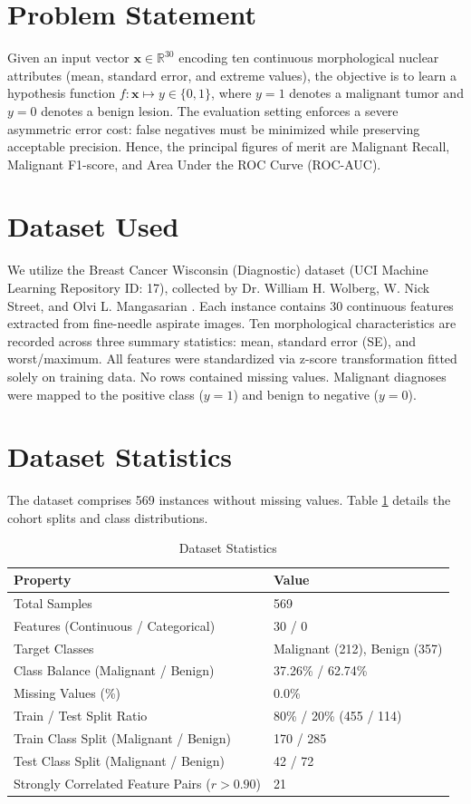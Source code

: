 \documentclass[conference,10pt]{IEEEtran}
\begin{document}
\section{Problem Statement}
Given an input vector $\mathbf{x} \in \mathbb{R}^{30}$ encoding ten continuous morphological nuclear attributes (mean, standard error, and extreme values), the objective is to learn a hypothesis function $f: \mathbf{x} \mapsto y \in \{0, 1\}$, where $y=1$ denotes a malignant tumor and $y=0$ denotes a benign lesion. The evaluation setting enforces a severe asymmetric error cost: false negatives must be minimized while preserving acceptable precision. Hence, the principal figures of merit are Malignant Recall, Malignant F1-score, and Area Under the ROC Curve (ROC-AUC).

\section{Dataset Used}
We utilize the Breast Cancer Wisconsin (Diagnostic) dataset (UCI Machine Learning Repository ID: 17), collected by Dr. William H. Wolberg, W. Nick Street, and Olvi L. Mangasarian \cite{wdbc1995}. Each instance contains 30 continuous features extracted from fine-needle aspirate images. Ten morphological characteristics are recorded across three summary statistics: mean, standard error (SE), and worst/maximum. All features were standardized via z-score transformation fitted solely on training data. No rows contained missing values. Malignant diagnoses were mapped to the positive class ($y=1$) and benign to negative ($y=0$).

\section{Dataset Statistics}
The dataset comprises 569 instances without missing values. Table \ref{tab:dataset} details the cohort splits and class distributions.

\begin{table}[htbp]
\caption{Dataset Statistics}
\label{tab:dataset}
\centering
\begin{tabular}{ll}
\toprule
\textbf{Property} & \textbf{Value} \\
\midrule
Total Samples & 569 \\
Features (Continuous / Categorical) & 30 / 0 \\
Target Classes & Malignant (212), Benign (357) \\
Class Balance (Malignant / Benign) & 37.26\% / 62.74\% \\
Missing Values (\%) & 0.0\% \\
Train / Test Split Ratio & 80\% / 20\% (455 / 114) \\
Train Class Split (Malignant / Benign) & 170 / 285 \\
Test Class Split (Malignant / Benign) & 42 / 72 \\
Strongly Correlated Feature Pairs ($r > 0.90$) & 21 \\
\bottomrule
\end{tabular}
\end{table}
\end{document}
